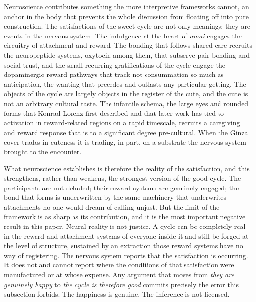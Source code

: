 Neuroscience contributes something the more interpretive frameworks cannot, an anchor in the body that prevents the whole discussion from floating off into pure construction. The satisfactions of the sweet cycle are not only meanings; they are events in the nervous system. The indulgence at the heart of \textit{amai} engages the circuitry of attachment and reward. The bonding that follows shared care recruits the neuropeptide systems, oxytocin among them, that subserve pair bonding and social trust, and the small recurring gratifications of the cycle engage the dopaminergic reward pathways that track not consummation so much as anticipation, the wanting that precedes and outlasts any particular getting. The objects of the cycle are largely objects in the register of the cute, and the cute is not an arbitrary cultural taste. The infantile schema, the large eyes and rounded forms that Konrad Lorenz first described and that later work has tied to activation in reward-related regions on a rapid timescale, recruits a caregiving and reward response that is to a significant degree pre-cultural. When the Ginza cover trades in cuteness it is trading, in part, on a substrate the nervous system brought to the encounter.

What neuroscience establishes is therefore the reality of the satisfaction, and this strengthens, rather than weakens, the strongest version of the good cycle. The participants are not deluded; their reward systems are genuinely engaged; the bond that forms is underwritten by the same machinery that underwrites attachments no one would dream of calling unjust. But the limit of the framework is as sharp as its contribution, and it is the most important negative result in this paper. Neural reality is not justice. A cycle can be completely real in the reward and attachment systems of everyone inside it and still be forged at the level of structure, sustained by an extraction those reward systems have no way of registering. The nervous system reports that the satisfaction is occurring. It does not and cannot report where the conditions of that satisfaction were manufactured or at whose expense. Any argument that moves from \textit{they are genuinely happy} to \textit{the cycle is therefore good} commits precisely the error this subsection forbids. The happiness is genuine. The inference is not licensed.

